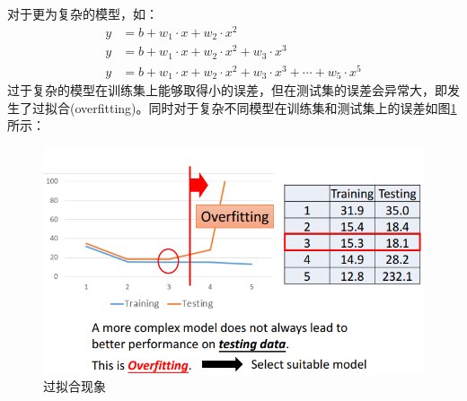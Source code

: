 \documentclass[UTF8]{ctexbook}
\begin{document}
对于更为复杂的模型，如：
\begin{align*}
	y &= b + w_1 \cdot x + w_2 \cdot x^2 \\
	y &= b + w_1 \cdot x + w_2 \cdot x^2 + w_3 \cdot x^3 \\
	y &= b + w_1 \cdot x + w_2 \cdot x^2 + w_3 \cdot x^3 + \cdots + w_5 \cdot x^5
\end{align*}
过于复杂的模型在训练集上能够取得小的误差，但在测试集的误差会异常大，即发生了过拟合(overfitting)。同时对于复杂不同模型在训练集和测试集上的误差如图\ref{fig:overfitting}所示：
\begin{figure}
	\centering
	\includegraphics[scale=0.5]{pic/overfitting }
	\caption{过拟合现象}
	\label{fig:overfitting}
\end{figure}
\end{document}
